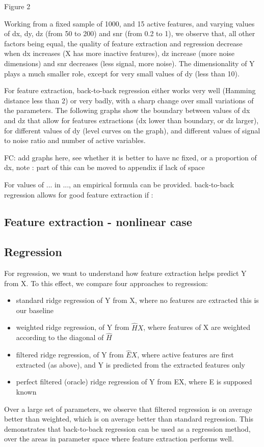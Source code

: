 \documentclass{article}
\begin{document}
Figure 2

Working from a fixed sample of 1000, and 15 active features, and varying values of dx, dy, dz (from 50 to 200) and snr (from 0.2 to 1), we observe that, all other factors being equal, the quality of feature extraction and regression decrease when dx increases (X has more inactive features), dz increase (more noise dimensions) and snr decreases (less signal, more noise).
%
The dimensionality of Y plays a much smaller role, except for very small values of dy (less than 10).

For feature extraction, back-to-back regression either works very well (Hamming distance less than 2) or very badly, with a sharp change over small variations of the parameters.
%
The following graphs show the boundary between values of dx and dz that allow for features extractions (dx lower than boundary, or dz larger), for different values of dy (level curves on the graph), and different values of signal to noise ratio and number of active variables.

FC: add graphs here, see whether it is better to have nc fixed, or a proportion of dx, note : part of this can be moved to appendix if lack of space

For values of ...
%
in ..., an empirical formula can be provided.
%
back-to-back regression allows for good feature extraction if :

\subsection{Feature extraction - nonlinear case}


\subsection{Regression }
For regression, we want to understand how feature extraction helps predict Y from X.
%
To this effect, we compare four approaches to regression:
\begin{itemize}
\item standard ridge regression of Y from X, where no features are extracted this is our baseline
\item weighted ridge regression, of Y from $\hat H X$, where features of X are weighted according to the diagonal of $\hat H$
\item filtered ridge regression, of Y from $\hat E X$, where active features are first extracted (as above), and Y is predicted from the extracted features only
\item perfect filtered (oracle) ridge regression of Y from EX, where E is supposed known
\end{itemize}
Over a large set of parameters, we observe that filtered regression is on average better than weighted, which is on average better than standard regression.
%
This demonstrates that back-to-back regression can be used as a regression method, over the areas in parameter space where feature extraction performs well.
\end{document}
